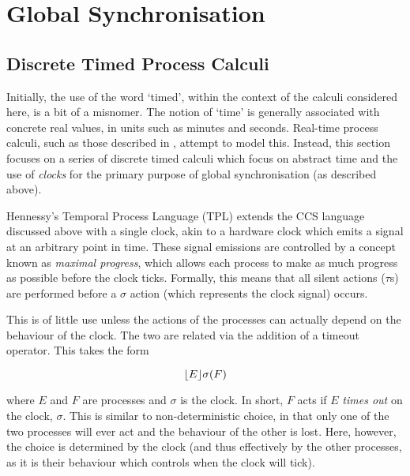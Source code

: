 
\chapter{Global Synchronisation}
\label{globsync}

\section{Discrete Timed Process Calculi}
\label{timing}

Initially, the use of the word `timed', within the context of the
calculi considered here, is a bit of a misnomer.  The notion of `time'
is generally associated with concrete real values, in units such as
minutes and seconds.  Real-time process calculi, such as those
described in \cite{aceto:timing, beaten:timing, brics:lee,
  lee:realtime, tccs, satoh:phd, satoh:distrib}, attempt to model
this.  Instead, this section focuses on a series of discrete timed
calculi which focus on abstract time and the use of \emph{clocks} for
the primary purpose of global synchronisation (as described above).

Hennessy's Temporal Process Language (TPL) \cite{hennessy:tpl} extends
the CCS language discussed above with a single clock, akin to a
hardware clock which emits a signal at an arbitrary point in time.
These signal emissions are controlled by a concept known as
\emph{maximal progress}, which allows each process to make as much
progress as possible before the clock ticks.  Formally, this means
that all silent actions ($\tau$s) are performed before a $\sigma$
action (which represents the clock signal) occurs.

This is of little use unless the actions of the processes can actually
depend on the behaviour of the clock.  The two are related via the
addition of a timeout operator.  This takes the form

\begin{equation}
\lfloor{E}\rfloor {\sigma} ({F})
\end{equation}

\noindent where $E$ and $F$ are processes and $\sigma$ is the clock.  In
short, $F$ acts if $E$ \emph{times out} on the clock, $\sigma$.  This is
similar to non-deterministic choice, in that only one of the two
processes will ever act and the behaviour of the other is lost.  Here,
however, the choice is determined by the clock (and thus effectively by
the other processes, as it is their behaviour which controls when the
clock will tick).

